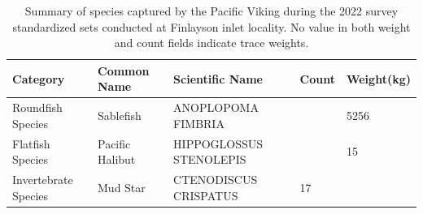 \documentclass[12pt]{article}\usepackage[]{graphicx}\usepackage[]{color}
\begin{document}
\begin{table}[!h]

\caption{\label{tab:table5}Summary of species captured by the Pacific Viking during the 2022 survey standardized sets conducted at Finlayson inlet locality. No value in both weight and count fields indicate trace weights.}
\fontsize{8}{10}\selectfont
\begin{tabular}[t]{lllll}
\toprule
\textbf{Category} & \textbf{Common Name} & \textbf{Scientific Name} & \textbf{Count} & \textbf{Weight(kg)}\\
\midrule
Roundfish Species & Sablefish & ANOPLOPOMA FIMBRIA &  & 5256\\
\midrule
Flatfish Species & Pacific Halibut & HIPPOGLOSSUS STENOLEPIS &  & 15\\
\midrule
Invertebrate Species & Mud Star & CTENODISCUS CRISPATUS & 17 & \\
\bottomrule
\end{tabular}
\end{table}
\end{document}
